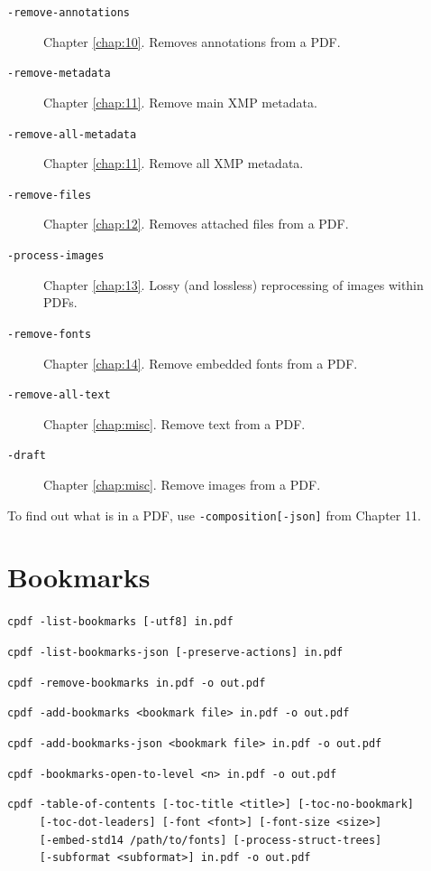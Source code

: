 \documentclass{book}
\begin{document}
\begin{description}
\item[\normalfont\texttt{-remove-annotations}] Chapter \ref{chap:10}. Removes annotations from a PDF.
\item[\normalfont\texttt{-remove-metadata}] Chapter \ref{chap:11}. Remove main XMP metadata.
\item[\normalfont\texttt{-remove-all-metadata}] Chapter \ref{chap:11}. Remove all XMP metadata.
\item[\normalfont\texttt{-remove-files}] Chapter \ref{chap:12}. Removes attached files from a PDF.
\item[\normalfont\texttt{-process-images}] Chapter \ref{chap:13}. Lossy (and lossless) reprocessing of images within PDFs.
\item[\normalfont\texttt{-remove-fonts}] Chapter \ref {chap:14}. Remove embedded fonts from a PDF.
\item[\normalfont\texttt{-remove-all-text}] Chapter \ref{chap:misc}. Remove text from a PDF.
\item[\normalfont\texttt{-draft}] Chapter \ref{chap:misc}. Remove images from a PDF.
\end{description}

\noindent To find out what is in a PDF, use \texttt{-composition[-json]} from Chapter 11.

\chapter{Bookmarks}\label{chap:6}

  \begin{framed}
  \small\noindent\verb!cpdf -list-bookmarks [-utf8] in.pdf!

  \vspace{1.5mm}
  \small\noindent\verb!cpdf -list-bookmarks-json [-preserve-actions] in.pdf!

  \vspace{1.5mm}
  \small\noindent\verb!cpdf -remove-bookmarks in.pdf -o out.pdf!

  \vspace{1.5mm}
  \small\noindent\verb!cpdf -add-bookmarks <bookmark file> in.pdf -o out.pdf!

  \vspace{1.5mm}
  \small\noindent\verb!cpdf -add-bookmarks-json <bookmark file> in.pdf -o out.pdf!

  \vspace{1.5mm}
  \small\noindent\verb!cpdf -bookmarks-open-to-level <n> in.pdf -o out.pdf!

  \vspace{1.5mm}
  \small\noindent\verb!cpdf -table-of-contents [-toc-title <title>] [-toc-no-bookmark]!\\
  \small\noindent\verb!     [-toc-dot-leaders] [-font <font>] [-font-size <size>] !\\
  \small\noindent\verb!     [-embed-std14 /path/to/fonts] [-process-struct-trees] !\\
  \small\noindent\verb!     [-subformat <subformat>] in.pdf -o out.pdf!

  \end{framed}
\end{document}
